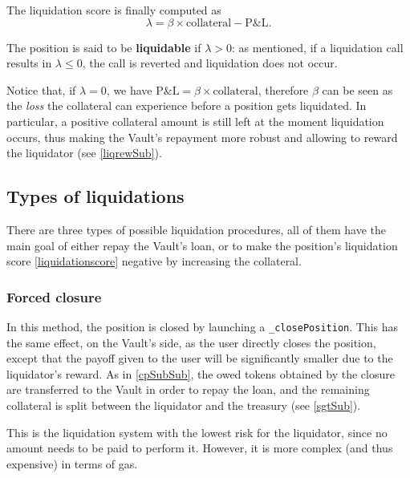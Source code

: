 \documentclass[a4paper,10 pt]{article}
\theoremstyle{definition}
\begin{document}
The liquidation score is finally computed as
\begin{equation}\label{liquidationscore}
\lambda = \beta \times \text{collateral} - \text{P\&L}.
\end{equation}

The position is said to be {\bf liquidable} if $\lambda > 0$: as mentioned, if a liquidation call results in $\lambda \le 0$, the call is reverted and liquidation does not occur.

Notice that, if $\lambda = 0$, we have $\text{P\&L} = \beta\times\text{collateral}$, therefore $\beta$ can be seen as the {\it loss} the collateral can experience before a position gets liquidated. In particular, a positive collateral amount is still left at the moment liquidation occurs, thus making the Vault's repayment more robust and allowing to reward the liquidator (see \ref{liqrewSub}).

\subsection{Types of liquidations}\label{tolSub}
There are three types of possible liquidation procedures, all of them have the main goal of either repay the Vault's loan, or to make the position's liquidation score \eqref{liquidationscore} negative by increasing the collateral.

\subsubsection{Forced closure}\label{fcSubSub}
In this method, the position is closed by launching a \verb|_closePosition|. This has the same effect, on the Vault's side, as the user directly closes the position, except that the payoff given to the user will be significantly smaller due to the liquidator's reward. As in \ref{cpSubSub}, the owed tokens obtained by the closure are transferred to the Vault in order to repay the loan, and the remaining collateral is split between the liquidator and the treasury (see \ref{sgtSub}).

This is the liquidation system with the lowest risk for the liquidator, since no amount needs to be paid to perform it. However, it is more complex (and thus expensive) in terms of gas.
\end{document}
